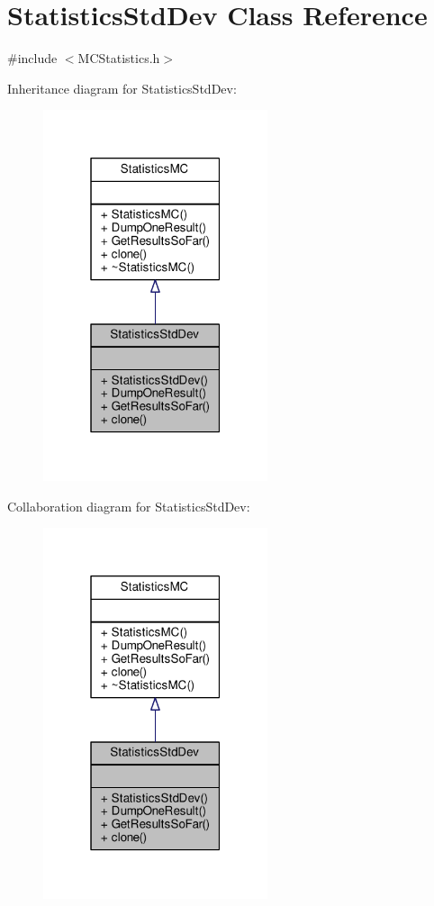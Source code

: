 \hypertarget{classStatisticsStdDev}{}\section{Statistics\+Std\+Dev Class Reference}
\label{classStatisticsStdDev}


{\ttfamily \#include $<$M\+C\+Statistics.\+h$>$}



Inheritance diagram for Statistics\+Std\+Dev\+:
\nopagebreak
\begin{figure}[H]
\begin{center}
\leavevmode
\includegraphics[width=187pt]{classStatisticsStdDev__inherit__graph}
\end{center}
\end{figure}


Collaboration diagram for Statistics\+Std\+Dev\+:
\nopagebreak
\begin{figure}[H]
\begin{center}
\leavevmode
\includegraphics[width=187pt]{classStatisticsStdDev__coll__graph}
\end{center}
\end{figure}
